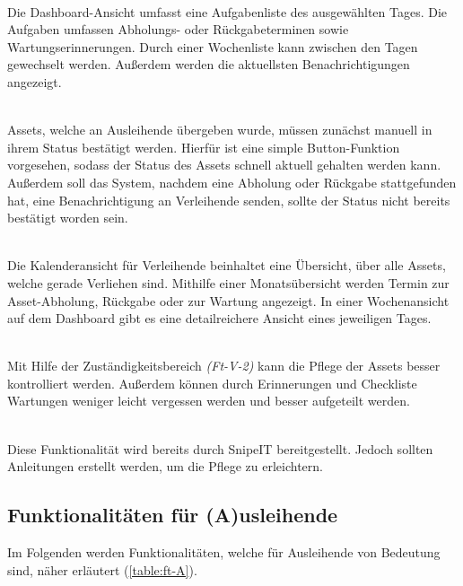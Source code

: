 {\sffamily\color{maincolor}{Ft-V-1 | Dashboard }}\\
Die Dashboard-Ansicht umfasst eine Aufgabenliste des ausgewählten Tages. Die Aufgaben umfassen
Abholungs- oder Rückgabeterminen sowie Wartungserinnerungen. Durch einer Wochenliste kann zwischen
den Tagen gewechselt werden. Außerdem werden die aktuellsten Benachrichtigungen angezeigt.

{\sffamily\color{maincolor}{Ft-V-2 | Bearbeiten des Assetstatus }}\\
Assets, welche an Ausleihende übergeben wurde, müssen zunächst manuell in ihrem Status bestätigt
werden. Hierfür ist eine simple Button-Funktion vorgesehen, sodass der Status des Assets schnell aktuell
gehalten werden kann. Außerdem soll das System, nachdem eine Abholung oder Rückgabe stattgefunden
hat, eine Benachrichtigung an Verleihende senden, sollte der Status nicht bereits bestätigt worden
sein.

{\sffamily\color{maincolor}{Ft-B-4 | Kalenderansicht für Verleihende}}\\
Die Kalenderansicht für Verleihende beinhaltet eine Übersicht, über alle Assets, welche gerade
Verliehen sind. Mithilfe einer Monatsübersicht werden Termin zur Asset-Abholung, Rückgabe oder zur
Wartung angezeigt. In einer Wochenansicht auf dem Dashboard gibt es eine detailreichere Ansicht
eines jeweiligen Tages.


    {\sffamily\color{maincolor}{Ft-V-3 | Pflege von Assets   }}\\
Mit Hilfe der Zuständigkeitsbereich \textit{(Ft-V-2)} kann die Pflege der Assets besser kontrolliert
werden. Außerdem können durch Erinnerungen und Checkliste Wartungen weniger leicht vergessen werden
und besser aufgeteilt werden. 


    {\sffamily\color{maincolor}{Ft-V-4 | Pflege der Datenbank }}\\
    Diese Funktionalität wird bereits durch SnipeIT bereitgestellt. Jedoch sollten Anleitungen
erstellt werden, um die Pflege zu erleichtern. 

\subsection{Funktionalitäten für (A)usleihende}
Im Folgenden werden Funktionalitäten, welche für Ausleihende von Bedeutung sind, näher erläutert
(\ref{table:ft-A}).

